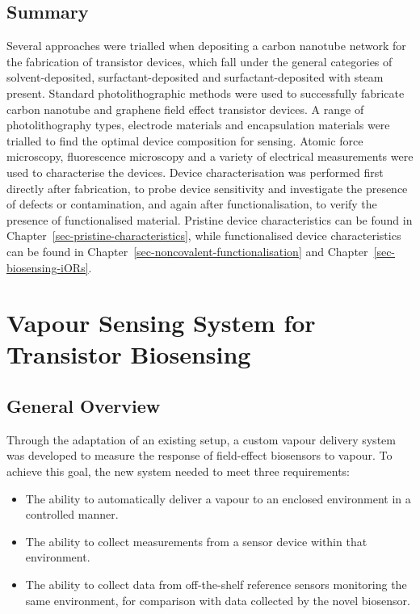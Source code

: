 \documentclass[
  a4paper,
]{scrbook}
\begin{document}
\hypertarget{summary-2}{%
\section{Summary}\label{summary-2}}

Several approaches were trialled when depositing a carbon nanotube
network for the fabrication of transistor devices, which fall under the
general categories of solvent-deposited, surfactant-deposited and
surfactant-deposited with steam present. Standard photolithographic
methods were used to successfully fabricate carbon nanotube and graphene
field effect transistor devices. A range of photolithography types,
electrode materials and encapsulation materials were trialled to find
the optimal device composition for sensing. Atomic force microscopy,
fluorescence microscopy and a variety of electrical measurements were
used to characterise the devices. Device characterisation was performed
first directly after fabrication, to probe device sensitivity and
investigate the presence of defects or contamination, and again after
functionalisation, to verify the presence of functionalised material.
Pristine device characteristics can be found in
Chapter~\ref{sec-pristine-characteristics}, while functionalised device
characteristics can be found in
Chapter~\ref{sec-noncovalent-functionalisation} and
Chapter~\ref{sec-biosensing-iORs}.


\hypertarget{sec-vapour-sensing-biosensors}{%
\chapter{Vapour Sensing System for Transistor
Biosensing}\label{sec-vapour-sensing-biosensors}}

\hypertarget{general-overview-1}{%
\section{General Overview}\label{general-overview-1}}

Through the adaptation of an existing setup, a custom vapour delivery
system was developed to measure the response of field-effect biosensors
to vapour. To achieve this goal, the new system needed to meet three
requirements:

\begin{itemize}
\item
  The ability to automatically deliver a vapour to an enclosed
  environment in a controlled manner.
\item
  The ability to collect measurements from a sensor device within that
  environment.
\item
  The ability to collect data from off-the-shelf reference sensors
  monitoring the same environment, for comparison with data collected by
  the novel biosensor.
\end{itemize}
\end{document}
